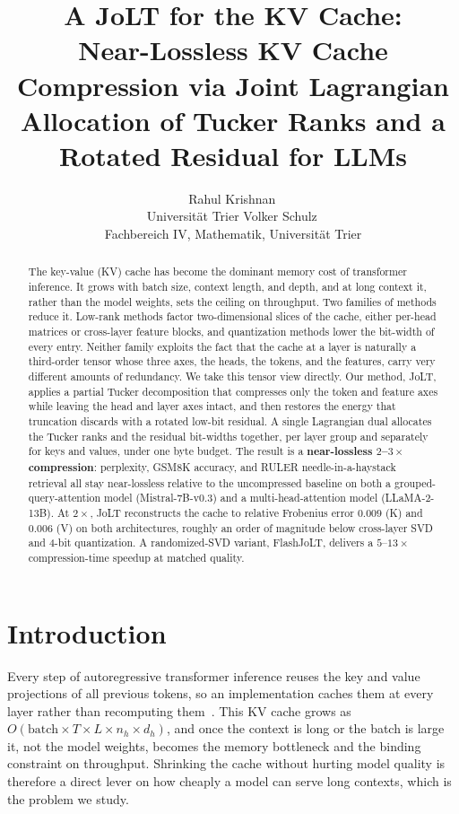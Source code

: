 \documentclass{article}
\title{A JoLT for the KV Cache:\\ Near-Lossless KV Cache Compression via Joint Lagrangian Allocation of Tucker Ranks and a Rotated Residual for LLMs}
\author{%
  Rahul Krishnan\,\orcidlink{0009-0000-4542-7989} \\
  Universit\"at Trier
  \And
  Volker Schulz\,\orcidlink{0000-0001-7665-130X} \\
  Fachbereich IV, Mathematik, Universit\"at Trier
}
\begin{document}
\maketitle

\begin{abstract}
The key-value (KV) cache has become the dominant memory cost of transformer inference. It grows with batch size, context length, and depth, and at long context it, rather than the model weights, sets the ceiling on throughput. Two families of methods reduce it. Low-rank methods factor two-dimensional slices of the cache, either per-head matrices or cross-layer feature blocks, and quantization methods lower the bit-width of every entry. Neither family exploits the fact that the cache at a layer is naturally a third-order tensor whose three axes, the heads, the tokens, and the features, carry very different amounts of redundancy. We take this tensor view directly. Our method, JoLT, applies a partial Tucker decomposition that compresses only the token and feature axes while leaving the head and layer axes intact, and then restores the energy that truncation discards with a rotated low-bit residual. A single Lagrangian dual allocates the Tucker ranks and the residual bit-widths together, per layer group and separately for keys and values, under one byte budget. The result is a \textbf{\boldmath near-lossless $2$--$3\times$ compression}: perplexity, GSM8K accuracy, and RULER needle-in-a-haystack retrieval all stay near-lossless relative to the uncompressed baseline on both a grouped-query-attention model (Mistral-7B-v0.3) and a multi-head-attention model (LLaMA-2-13B). At $2\times$, JoLT reconstructs the cache to relative Frobenius error $0.009$ (K) and $0.006$ (V) on both architectures, roughly an order of magnitude below cross-layer SVD and 4-bit quantization. A randomized-SVD variant, FlashJoLT, delivers a $5$--$13\times$ compression-time speedup at matched quality.
\end{abstract}

\section{Introduction}
Every step of autoregressive transformer inference reuses the key and value projections of all previous tokens, so an implementation caches them at every layer rather than recomputing them~\citep{vaswani2017attention}. This KV cache grows as $O(\text{batch} \times T \times L \times n_h \times d_h)$, and once the context is long or the batch is large it, not the model weights, becomes the memory bottleneck and the binding constraint on throughput. Shrinking the cache without hurting model quality is therefore a direct lever on how cheaply a model can serve long contexts, which is the problem we study.
\end{document}

